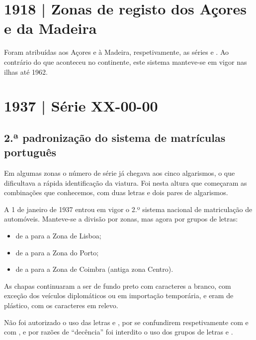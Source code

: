 \section{1918 | Zonas de registo dos Açores e da Madeira}

Foram atribuídas aos Açores e à Madeira, respetivamente, as séries 
e . Ao contrário do que aconteceu no continente, este sistema
manteve-se em vigor nas ilhas até 1962.

\section{1937 | Série XX-00-00}
\subsection*{2.ª padronização do sistema de matrículas português}

Em algumas zonas o número de série já chegava aos cinco algarismos, o que
dificultava a rápida identificação da viatura. Foi nesta altura que começaram as
combinações que conhecemos, com duas letras e dois pares de algarismos.

A 1 de janeiro de 1937 entrou em vigor o 2.º sistema nacional de matriculação de
automóveis. Manteve-se a divisão por zonas, mas agora por grupos de letras:
\begin{itemize}
  \item de  a  para a Zona de Lisboa;
  \item de  a  para a Zona do Porto;
  \item de  a  para a Zona de Coimbra (antiga zona Centro).
\end{itemize}

As chapas continuaram a ser de fundo preto com caracteres a branco, com exceção
dos veículos diplomáticos ou em importação temporária, e eram de plástico, com
os caracteres em relevo.


Não foi autorizado o uso das letras  e , por se confundirem
respetivamente com  e com , e por razões de “decência” foi
interdito o uso dos grupos de letras  e .

